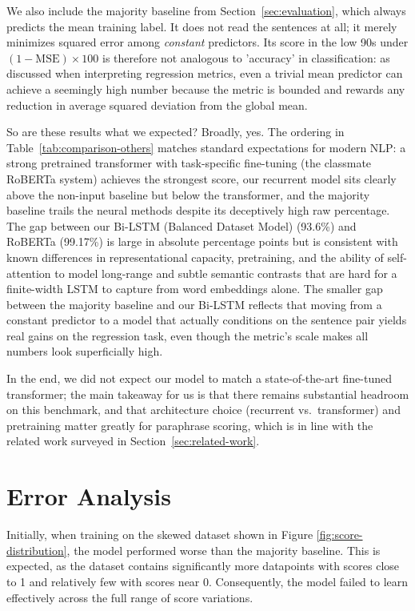 \documentclass[11pt]{article}
\begin{document}
We also include the majority baseline from Section~\ref{sec:evaluation},
 which always predicts the mean training label. It does not read 
 the sentences at all; it merely minimizes squared error among 
 \emph{constant} predictors. Its score in the low 90s 
 under $(1-\mathrm{MSE})\times 100$ is therefore not analogous to 
 'accuracy' in classification: as discussed when interpreting 
 regression metrics, even a trivial mean predictor can achieve 
 a seemingly high number because the metric is bounded and rewards 
 any reduction in average squared deviation from the global mean. 

So are these results what we expected? Broadly, yes. 
The ordering in Table~\ref{tab:comparison-others} matches 
standard expectations for modern NLP: a strong pretrained 
transformer with task-specific fine-tuning (the classmate 
RoBERTa system) achieves the strongest score, our recurrent 
model sits clearly above the non-input baseline but below the 
transformer, and the majority baseline trails the neural methods 
despite its deceptively high raw percentage. The gap between 
our Bi-LSTM (Balanced Dataset Model) (93.6\%) and RoBERTa (99.17\%) is large in 
absolute percentage points but is consistent with known 
differences in representational capacity, pretraining, and 
the ability of self-attention to model long-range and subtle 
semantic contrasts that are hard for a finite-width LSTM to 
capture from word embeddings alone. The smaller gap between 
the majority baseline and our Bi-LSTM reflects that moving 
from a constant predictor to a model that actually conditions 
on the sentence pair yields real gains on the regression task, 
even though the metric's scale makes all numbers look superficially 
high. 

In the end, we did not expect our model to match a state-of-the-art 
fine-tuned transformer; the main takeaway for us is that there 
remains substantial headroom on this benchmark, and that 
architecture choice (recurrent vs.\ transformer) and pretraining 
matter greatly for paraphrase scoring, which is in line with the related 
work surveyed in Section~\ref{sec:related-work}. 



\section{Error Analysis}

Initially, when training on the skewed dataset shown in Figure \ref{fig:score-distribution},
the model performed worse than the majority baseline. This is expected, as the dataset
contains significantly more datapoints with scores close to 1 and relatively few
with scores near 0. Consequently, the model failed to learn effectively
across the full range of score variations.
\end{document}
